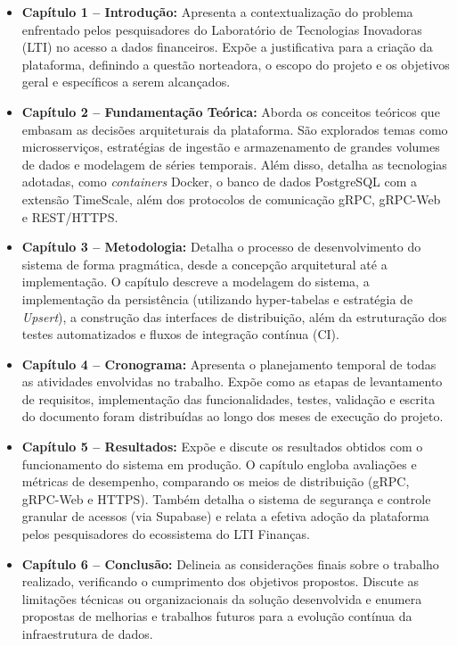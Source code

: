 \begin{itemize}
    \item \textbf{Capítulo 1 -- Introdução:} Apresenta a contextualização do problema enfrentado pelos pesquisadores do Laboratório de Tecnologias Inovadoras (LTI) no acesso a dados financeiros. Expõe a justificativa para a criação da plataforma, definindo a questão norteadora, o escopo do projeto e os objetivos geral e específicos a serem alcançados.
    
    \item \textbf{Capítulo 2 -- Fundamentação Teórica:} Aborda os conceitos teóricos que embasam as decisões arquiteturais da plataforma. São explorados temas como microsserviços, estratégias de ingestão e armazenamento de grandes volumes de dados e modelagem de séries temporais. Além disso, detalha as tecnologias adotadas, como \textit{containers} Docker, o banco de dados PostgreSQL com a extensão TimeScale, além dos protocolos de comunicação gRPC, gRPC-Web e REST/HTTPS.
    
    \item \textbf{Capítulo 3 -- Metodologia:} Detalha o processo de desenvolvimento do sistema de forma pragmática, desde a concepção arquitetural até a implementação. O capítulo descreve a modelagem do sistema, a implementação da persistência (utilizando hyper-tabelas e estratégia de \textit{Upsert}), a construção das interfaces de distribuição, além da estruturação dos testes automatizados e fluxos de integração contínua (CI).
    
    \item \textbf{Capítulo 4 -- Cronograma:} Apresenta o planejamento temporal de todas as atividades envolvidas no trabalho. Expõe como as etapas de levantamento de requisitos, implementação das funcionalidades, testes, validação e escrita do documento foram distribuídas ao longo dos meses de execução do projeto.
    
    \item \textbf{Capítulo 5 -- Resultados:} Expõe e discute os resultados obtidos com o funcionamento do sistema em produção. O capítulo engloba avaliações e métricas de desempenho, comparando os meios de distribuição (gRPC, gRPC-Web e HTTPS). Também detalha o sistema de segurança e controle granular de acessos (via Supabase) e relata a efetiva adoção da plataforma pelos pesquisadores do ecossistema do LTI Finanças.
    
    \item \textbf{Capítulo 6 -- Conclusão:} Delineia as considerações finais sobre o trabalho realizado, verificando o cumprimento dos objetivos propostos. Discute as limitações técnicas ou organizacionais da solução desenvolvida e enumera propostas de melhorias e trabalhos futuros para a evolução contínua da infraestrutura de dados.
\end{itemize}
\newpage
